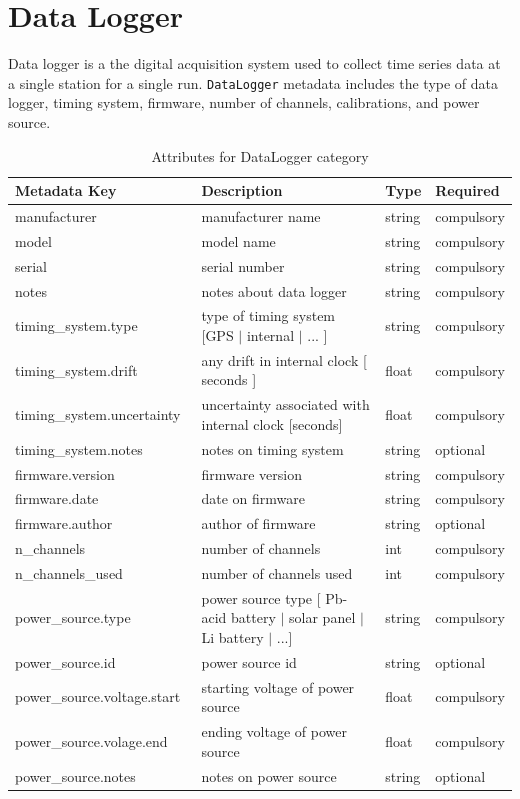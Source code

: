 \documentclass{article}
\begin{document}
\newpage
\section{Data Logger}

Data logger is a the digital acquisition system used to collect time series data at a single station for a single run.  \verb|DataLogger| metadata includes the type of data logger, timing system, firmware, number of channels, calibrations, and power source.

\begin{table}[htb!]
    \caption[Attributes for DataLogger]{Attributes for DataLogger category}
    \begin{tabular}{|l|p{3in}|l|l|}
        \hline
        \textbf{Metadata Key} & \textbf{Description} & \textbf{Type} & \textbf{Required} \\ \hline
        manufacturer\ & manufacturer name & string & compulsory \\ \hline
        model\ & model name & string & compulsory \\ \hline
        serial\ & serial number & string & compulsory \\ \hline
        notes\ & notes about data logger & string & compulsory \\ \hline
        timing\_system.type\ & type of timing system [GPS $|$ internal $|$ ... ] & string & compulsory \\ \hline
        timing\_system.drift\ & any drift in internal clock [ seconds ] & float & compulsory \\ \hline
        timing\_system.uncertainty\ & uncertainty associated with internal clock [seconds] & float & compulsory \\ \hline
        timing\_system.notes\ & notes on timing system & string & optional \\ \hline
        firmware.version\ & firmware version & string & compulsory \\ \hline
        firmware.date\ & date on firmware & string & compulsory \\ \hline
        firmware.author\ & author of firmware & string & optional \\ \hline
        n\_channels\ & number of channels & int & compulsory \\ \hline
        n\_channels\_used\ & number of channels used & int & compulsory \\ \hline
        power\_source.type\ & power source type [ Pb-acid battery $|$ solar panel $|$ Li battery $|$ ...] & string & compulsory \\ \hline
        power\_source.id\ & power source id & string & optional \\ \hline
        power\_source.voltage.start\ & starting voltage of power source & float & compulsory \\ \hline
        power\_source.volage.end\ & ending voltage of power source & float & compulsory \\ \hline
        power\_source.notes\ & notes on power source & string & optional \\ \hline
    \end{tabular}
    \label{tab:datalogger}
\end{table}    
\end{document}
